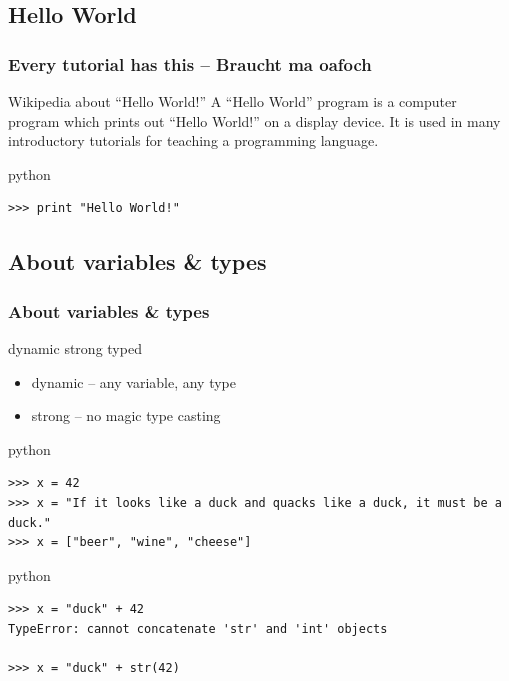 \documentclass{beamer}
\begin{document}
\subsection{Hello World}
\begin{frame}[fragile]
    \frametitle{Every tutorial has this -- Braucht ma oafoch}
    \begin{block}{Wikipedia about ``Hello World!''}
    A ``Hello World'' program is a computer program which prints out ``Hello World!'' on a display device. It is used in many introductory tutorials for teaching a programming language.
    \end{block}

    \begin{exampleblock}{python}
    \begin{lstlisting}
>>> print "Hello World!" 
    \end{lstlisting}
    \end{exampleblock}
\end{frame}

\subsection{About variables \& types}
\begin{frame}[fragile]
	\frametitle{About variables \& types}
	\begin{alertblock}{dynamic strong typed}
	\begin{itemize}
	\item dynamic -- any variable, any type
	\item strong -- no magic type casting
	\end{itemize}
		\pause
	\end{alertblock}
	\begin{exampleblock}{python}
	\begin{lstlisting}
>>> x = 42
>>> x = "If it looks like a duck and quacks like a duck, it must be a duck."
>>> x = ["beer", "wine", "cheese"]
	\end{lstlisting}
	\end{exampleblock}

	\pause

	\begin{exampleblock}{python}
	\begin{lstlisting}
>>> x = "duck" + 42
TypeError: cannot concatenate 'str' and 'int' objects

>>> x = "duck" + str(42)
	\end{lstlisting}
	\end{exampleblock}
\end{frame}
\end{document}
